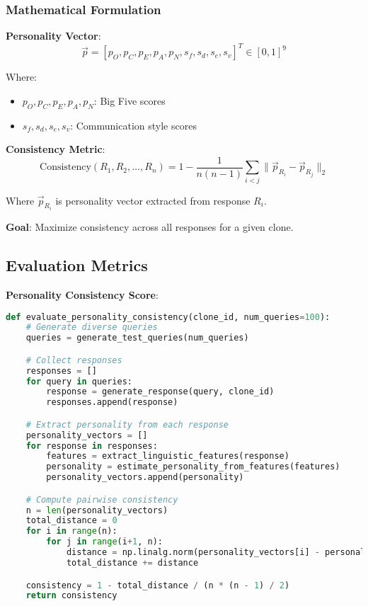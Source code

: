 \documentclass[10pt]{article}
\begin{document}
\subsubsection{Mathematical Formulation}

\textbf{Personality Vector}:
\[
\vec{p} = [p_O, p_C, p_E, p_A, p_N, s_f, s_d, s_e, s_v]^T \in [0,1]^9
\]

Where:
\begin{itemize}[leftmargin=*]
    \item $p_O, p_C, p_E, p_A, p_N$: Big Five scores
    \item $s_f, s_d, s_e, s_v$: Communication style scores
\end{itemize}

\textbf{Consistency Metric}:
\[
\text{Consistency}(R_1, R_2, \ldots, R_n) = 1 - \frac{1}{n(n-1)} \sum_{i<j} \|\vec{p}_{R_i} - \vec{p}_{R_j}\|_2
\]

Where $\vec{p}_{R_i}$ is personality vector extracted from response $R_i$.

\textbf{Goal}: Maximize consistency across all responses for a given clone.

\subsection{Evaluation Metrics}

\textbf{Personality Consistency Score}:
\begin{lstlisting}[language=Python]
def evaluate_personality_consistency(clone_id, num_queries=100):
    # Generate diverse queries
    queries = generate_test_queries(num_queries)

    # Collect responses
    responses = []
    for query in queries:
        response = generate_response(query, clone_id)
        responses.append(response)

    # Extract personality from each response
    personality_vectors = []
    for response in responses:
        features = extract_linguistic_features(response)
        personality = estimate_personality_from_features(features)
        personality_vectors.append(personality)

    # Compute pairwise consistency
    n = len(personality_vectors)
    total_distance = 0
    for i in range(n):
        for j in range(i+1, n):
            distance = np.linalg.norm(personality_vectors[i] - personality_vectors[j])
            total_distance += distance

    consistency = 1 - total_distance / (n * (n - 1) / 2)
    return consistency
\end{lstlisting}
\end{document}
